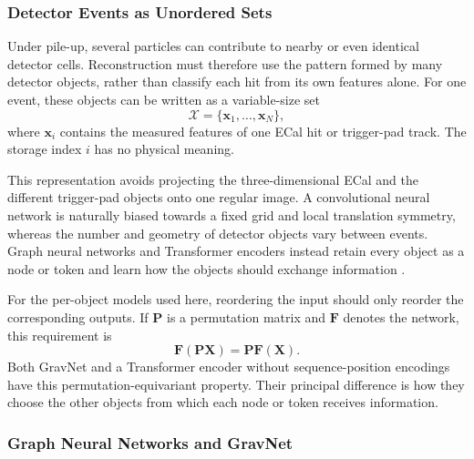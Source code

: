 \subsubsection{Detector Events as Unordered Sets}
\label{sec:detector_set_background}

Under pile-up, several particles can contribute to nearby or even identical
detector cells. Reconstruction must therefore use the pattern formed by many
detector objects, rather than classify each hit from its own features alone.
For one event, these objects can be written as a variable-size set
\begin{equation}
    \mathcal{X}
    =
    \{\mathbf{x}_1,\ldots,\mathbf{x}_N\},
\end{equation}
where \(\mathbf{x}_i\) contains the measured features of one ECal hit or
trigger-pad track. The storage index \(i\) has no physical meaning.

This representation avoids projecting the three-dimensional ECal and the
different trigger-pad objects onto one regular image. A convolutional neural
network is naturally biased towards a fixed grid and local translation
symmetry, whereas the number and geometry of detector objects vary between
events. Graph neural networks and Transformer encoders instead retain every
object as a node or token and learn how the objects should exchange
information \cite{duarte2020-gnn-tracking,lee2019-set-transformer}.

For the per-object models used here, reordering the input should only reorder
the corresponding outputs. If \(\mathbf{P}\) is a permutation matrix and
\(\mathbf{F}\) denotes the network, this requirement is
\begin{equation}
    \mathbf{F}(\mathbf{P}\mathbf{X})
    =
    \mathbf{P}\mathbf{F}(\mathbf{X}).
\end{equation}
Both GravNet and a Transformer encoder without sequence-position encodings
have this permutation-equivariant property. Their principal difference is
how they choose the other objects from which each node or token receives
information.

\subsubsection{Graph Neural Networks and GravNet}
\label{sec:gnn_gravnet_background}

